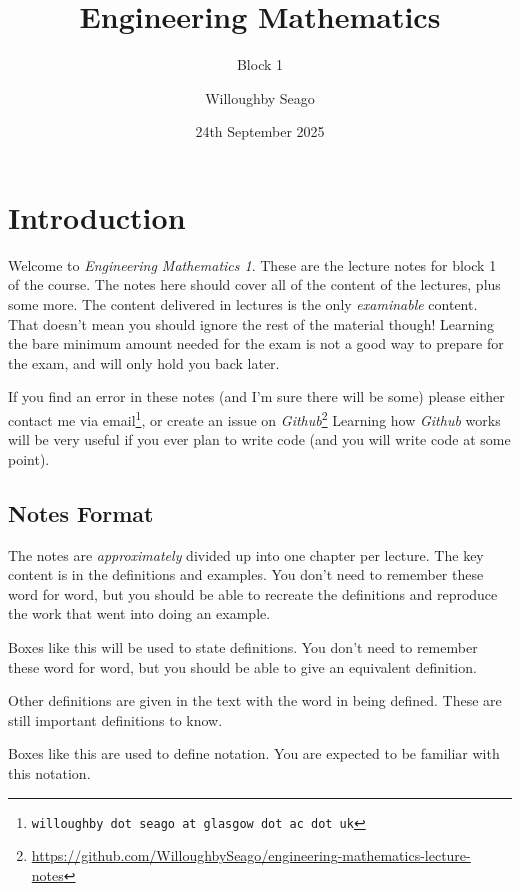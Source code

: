\documentclass[fleqn]{LectureClass/LectureClass}
\title{Engineering Mathematics}
\author{Willoughby Seago}
\date{24th September 2025}
\subtitle{Block 1}
\begin{document}
    \frontmatter
    \titlepage
    \innertitlepage{}
    \tableofcontents
    \mainmatter
    
    \chapter*{Introduction}
    Welcome to \textit{Engineering Mathematics 1}.
    These are the lecture notes for block 1 of the course.
    The notes here should cover all of the content of the lectures, plus some more.
    The content delivered in lectures is the only \emph{examinable} content.
    That doesn't mean you should ignore the rest of the material though!
    Learning the bare minimum amount needed for the exam is not a good way to prepare for the exam, and will only hold you back later.
    
    If you find an error in these notes (and I'm sure there will be some) please either contact me via email\footnote{\texttt{willoughby dot seago at glasgow dot ac dot uk}}, or create an issue on \textit{Github}\footnote{\url{https://github.com/WilloughbySeago/engineering-mathematics-lecture-notes}}
    Learning how \textit{Github} works will be very useful if you ever plan to write code (and you will write code at some point).
    
    \section{Notes Format}
    The notes are \emph{approximately} divided up into one chapter per lecture.
    The key content is in the definitions and examples.
    You don't need to remember these word for word, but you should be able to recreate the definitions and reproduce the work that went into doing an example.
    
    \begin{dfn}{}{}
        Boxes like this will be used to state definitions.
        You don't need to remember these word for word, but you should be able to give an equivalent definition.
    \end{dfn}
    
    Other definitions are given in the text with the word in  being defined.
    These are still important definitions to know.
    
    \begin{ntn}{}{}
        Boxes like this are used to define notation.
        You are expected to be familiar with this notation.
    \end{ntn}
    
\end{document}
